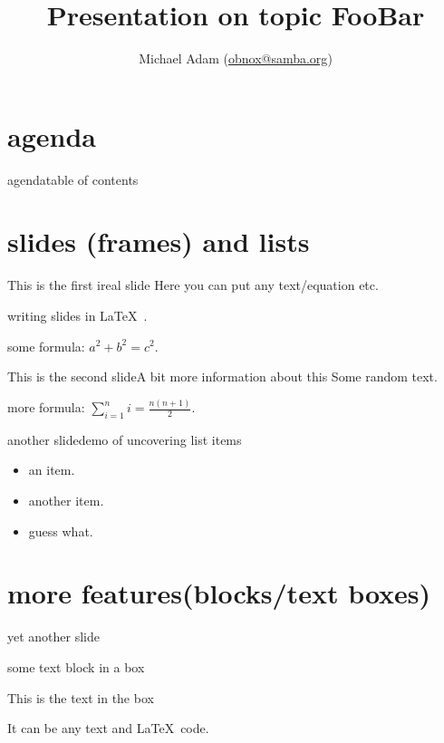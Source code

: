 \documentclass[10pt]{beamer}
\title{Presentation on  topic FooBar}
\author{Michael Adam (\href{mailto:obnox@samba.org}{obnox@samba.org})}
\begin{document}
    \maketitle



\section*{agenda}
\begin{frame}{agenda}{table of contents}

\tableofcontents

\end{frame}

    \section{slides (frames) and lists}
    \begin{frame}{This is the first ireal slide}
		Here you can put any text/equation etc. 

        writing slides in \LaTeX\ .

        some formula: $a^2 + b^2 = c^2$.


    \end{frame}
	\begin{frame}{This is the second slide}{A bit more information about this}
		Some random text.

        more formula: $\sum_{i=1}^{n}i = \frac{n(n+1)}{2}$.

    \end{frame}
    \begin{frame}{another slide}{demo of uncovering list items}
        \begin{itemize}
          \item<2-> an item.
          \item<3-> another item.
          \item<4-> guess what.
        \end{itemize}
    \end{frame}

\section{more features(blocks/text boxes) }
\begin{frame}{yet another slide}
\begin{block}{some text block in a box}

This is the text in the box

It can be any text and \LaTeX\ code.

\end{block}
\end{frame}
\end{document}
